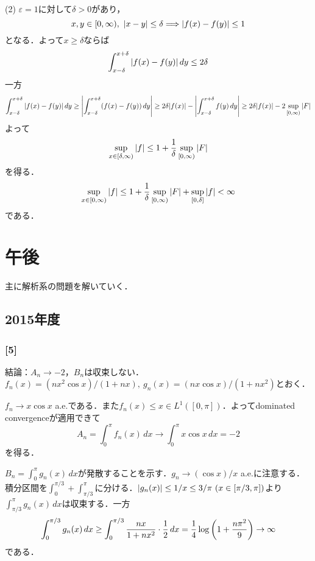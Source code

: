 \documentclass[a4j]{ltjsarticle}
\newcommand{\1}{\mathbbm{1}}
\numberwithin{equation}{section}
\theoremstyle{definition}
\begin{document}
(2) $\varepsilon=1$に対して$\delta>0$があり，
\begin{equation}
    x,y\in [0,\infty),\ \abs{x-y}\leq \delta\Longrightarrow \abs{f(x)-f(y)}\leq 1 
\end{equation}
となる．よって$x\geq \delta$ならば
\begin{equation}
    \int_{x-\delta}^{x+\delta}\abs{f(x)-f(y)}\,dy\leq 2\delta
\end{equation}
一方
\begin{equation}
    \int_{x-\delta}^{x+\delta}\abs{f(x)-f(y)}\,dy\geq \abs{\int_{x-\delta}^{x+\delta}(f(x)-f(y))\,dy}\geq2\delta\abs{f(x)}-\abs{\int_{x-\delta}^{x+\delta}f(y)\,dy}\geq 2\delta\abs{f(x)}-2\sup_{[0,\infty)}\abs{F}
\end{equation}
よって
\begin{equation}
    \sup_{x\in[\delta,\infty)}\abs{f}\leq 1+\frac{1}{\delta}\sup_{[0,\infty)}\abs{F}
\end{equation}
を得る．
\begin{equation}
    \sup_{x\in[0,\infty)}\abs{f}\leq 1+\frac{1}{\delta}\sup_{[0,\infty)}\abs{F}+\sup_{[0,\delta]}\abs{f}<\infty 
\end{equation}
である．

\section{午後}
主に解析系の問題を解いていく．
\subsection{2015年度}
\subsubsection*{[5]}
結論：$A_n\to -2$，$B_n$は収束しない．$f_n(x)=(nx^2\cos x)/(1+nx),\ g_n(x)=(nx\cos x)/(1+nx^2)$とおく．

$f_n\to x\cos x$ a.e.である．また$f_n(x)\leq x\in L^1([0,\pi])$．よってdominated convergenceが適用できて
\begin{equation}
    A_n=\int_{0}^{\pi}f_n(x)\,dx\to \int_{0}^{\pi}x\cos x\,dx=-2
\end{equation}
を得る．

$B_n=\int_{0}^{\pi}g_n(x)\,dx$が発散することを示す．$g_n\to (\cos x)/x$ a.e.に注意する．積分区間を$\int_{0}^{\pi/3}+\int_{\pi/3}^{\pi}$に分ける．$\abs{g_n(x)}\leq 1/x\leq 3/\pi\ (x\in[\pi/3,\pi])$より$\int_{\pi/3}^{\pi}g_n(x)\,dx$は収束する．一方
\begin{equation}
    \int_{0}^{\pi/3}g_n(x)\,dx\geq \int_{0}^{\pi/3}\frac{nx}{1+nx^2}\cdot\frac{1}{2}\,dx=\frac{1}{4}\log\qty(1+\frac{n\pi^2}{9})\to\infty 
\end{equation}
である．
\end{document}
